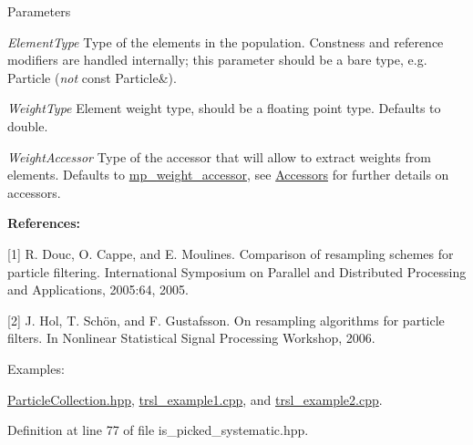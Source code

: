 \begin{DoxyParams}{Parameters}
\item[{\em ElementType}]Type of the elements in the population. Constness and reference modifiers are handled internally; this parameter should be a bare type, e.g. {\ttfamily Particle} ({\itshape not\/} {\ttfamily const Particle\&}).\item[{\em WeightType}]Element weight type, should be a floating point type. Defaults to {\ttfamily double}.\item[{\em WeightAccessor}]Type of the accessor that will allow to extract weights from elements. Defaults to \hyperlink{classtrsl_1_1mp__weight__accessor}{mp\_\-weight\_\-accessor}, see \hyperlink{group__accessor}{Accessors} for further details on accessors.\end{DoxyParams}
{\bfseries References:}


\begin{DoxyItemize}
\item \mbox{[}1\mbox{]} R. Douc, O. Cappe, and E. Moulines. Comparison of resampling schemes for particle filtering. International Symposium on Parallel and Distributed Processing and Applications, 2005:64, 2005.
\end{DoxyItemize}


\begin{DoxyItemize}
\item \mbox{[}2\mbox{]} J. Hol, T. Sch\"{o}n, and F. Gustafsson. On resampling algorithms for particle filters. In Nonlinear Statistical Signal Processing Workshop, 2006. 
\end{DoxyItemize}\begin{Desc}
\item[Examples: ]\par


\hyperlink{ParticleCollection_8hpp-example}{ParticleCollection.hpp}, \hyperlink{trsl__example1_8cpp-example}{trsl\_\-example1.cpp}, and \hyperlink{trsl__example2_8cpp-example}{trsl\_\-example2.cpp}.\end{Desc}


Definition at line 77 of file is\_\-picked\_\-systematic.hpp.

